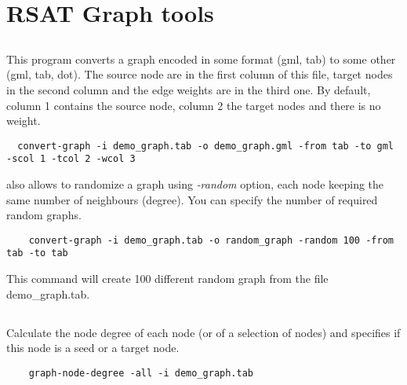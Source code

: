 \section{RSAT Graph tools}
\subsection{}
This program converts a graph encoded in some format (gml, tab) to some other (gml, tab, dot). The source node
are in the first column of this file, target nodes in the second column and the edge weights are in the third one.
By default, column 1 contains the source node, column 2 the target nodes and there is no weight.

{\begin{footnotesize}\begin{verbatim}
  convert-graph -i demo_graph.tab -o demo_graph.gml -from tab -to gml -scol 1 -tcol 2 -wcol 3
\end{verbatim} \end{footnotesize}
}

 also allows to randomize a graph using \textit{-random} option, each node keeping the same number of neighbours (degree).
You can specify the number of required random graphs.


{\begin{footnotesize}\begin{verbatim}
    convert-graph -i demo_graph.tab -o random_graph -random 100 -from tab -to tab
\end{verbatim} \end{footnotesize} 
}

This command will create 100 different random graph from the file demo\_graph.tab.

\subsection{}

Calculate the node degree of each node (or of a selection of nodes) and specifies if this node is a seed or a target node.

{\begin{footnotesize}\begin{verbatim}
    graph-node-degree -all -i demo_graph.tab
\end{verbatim} \end{footnotesize}
}

\subsection{}

